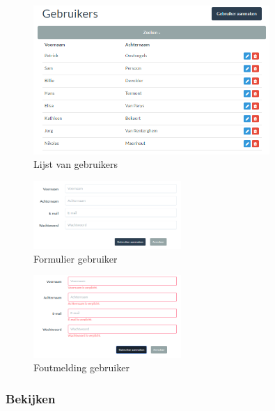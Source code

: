 \documentclass[11pt,openany]{article}
\begin{document}
\begin{figure}
	\centering
	\includegraphics[width=0.8\textwidth]{img/fig4.png}
	\caption{Lijst van gebruikers} 
	\label{fig:4} 
\end{figure}


\begin{figure}
	\centering
	\includegraphics[width=0.5\textwidth]{img/fig5.png}
	\caption{Formulier gebruiker} 
	\label{fig:5} 
\end{figure}

\begin{figure}
	\centering
	\includegraphics[width=0.5\textwidth]{img/fig6.png}
	\caption{Foutmelding gebruiker} 
	\label{fig:6} 
\end{figure}
\newpage
\subsubsection{Bekijken}
\end{document}
